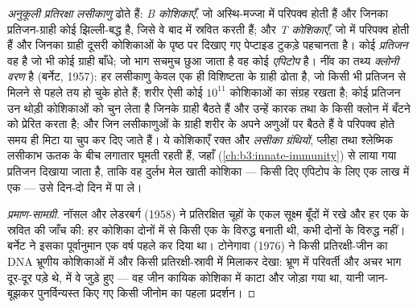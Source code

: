 \begin{definition}[लसीकाणु और उनके ग्राही]\label{def:b3:adaptive-immunity:lymphocytes}
\emph{अनुकूली प्रतिरक्षा} \emph{लसीकाणु} ढोते हैं: \emph{B कोशिकाएँ},
जो अस्थि-मज्जा में परिपक्व होती हैं और जिनका प्रतिजन-ग्राही कोई
झिल्ली-बद्ध \emph{} है, जिसे वे बाद में स्रवित करती हैं; और
\emph{T कोशिकाएँ}, जो  में परिपक्व होती हैं और जिनका ग्राही दूसरी
कोशिकाओं के पृष्ठ पर दिखाए गए पेप्टाइड टुकड़े पहचानता है। कोई
\emph{प्रतिजन} वह है जो भी कोई ग्राही बाँधे; जो भाग सचमुच छुआ जाता है वह
कोई \emph{एपिटोप} है। नींव का तथ्य \emph{क्लोनी वरण} है (बर्नेट, 1957):
हर लसीकाणु केवल एक ही विशिष्टता के ग्राही ढोता है, जो किसी भी प्रतिजन
से मिलने से पहले तय हो चुके होते हैं; शरीर ऐसी कोई $10^{11}$ कोशिकाओं
का संग्रह रखता है; कोई प्रतिजन उन थोड़ी कोशिकाओं को चुन लेता है जिनके
ग्राही बैठते हैं और उन्हें कारक तथा  के किसी क्लोन में
बँटने को प्रेरित करता है; और जिन लसीकाणुओं के ग्राही शरीर के अपने
अणुओं पर बैठते हैं वे परिपक्व होते समय ही मिटा या चुप कर दिए जाते हैं।
ये कोशिकाएँ रक्त और \emph{लसीका ग्रंथियों}, प्लीहा तथा श्लेष्मिक लसीकाभ
ऊतक के बीच लगातार घूमती रहती हैं, जहाँ 
(\cref{ch:b3:innate-immunity}) से लाया गया प्रतिजन दिखाया जाता है,
ताकि वह दुर्लभ मेल खाती कोशिका --- किसी दिए एपिटोप के लिए एक लाख में
एक --- उसे दिन-दो दिन में पा ले।
\end{definition}

\begin{proof}[प्रमाण-सामग्री]
नॉसल और लेडरबर्ग (1958) ने प्रतिरक्षित चूहों के एकल  सूक्ष्म
बूँदों में रखे और हर एक के स्रवित  की जाँच की: हर कोशिका
दोनों  में से किसी एक के विरुद्ध  बनाती थी, कभी
दोनों के विरुद्ध नहीं। बर्नेट ने इसका पूर्वानुमान एक वर्ष पहले कर दिया
था। टोनेगावा (1976) ने किसी प्रतिरक्षी-जीन का DNA भ्रूणीय कोशिकाओं में
और किसी प्रतिरक्षी-स्रावी  में मिलाकर देखा: भ्रूण में परिवर्ती
और अचर भाग दूर-दूर पड़े थे,  में वे जुड़े हुए --- वह जीन कायिक
कोशिका में काटा और जोड़ा गया था, यानी जान-बूझकर पुनर्विन्यस्त किए गए
किसी जीनोम का पहला प्रदर्शन।
\end{proof}

